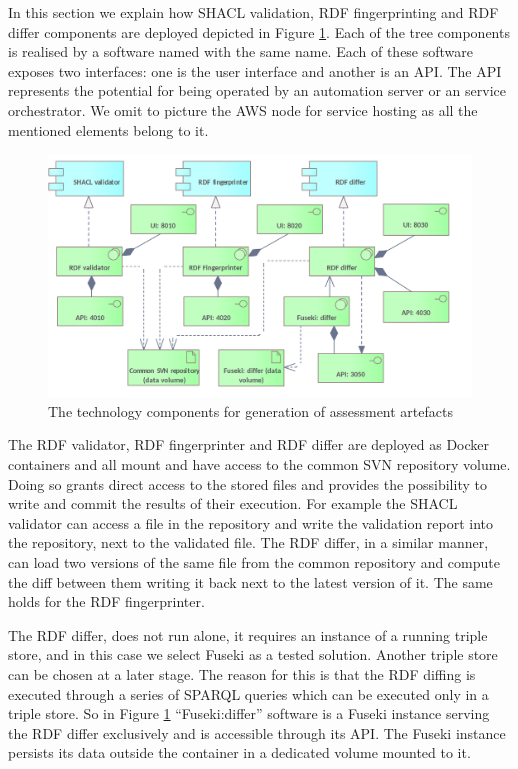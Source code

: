 	In this section we explain how SHACL validation, RDF fingerprinting and RDF differ components are deployed depicted in Figure \ref{fig:technology-view-validation}. Each of the tree components is realised by a software named with the same name. Each of these software exposes two interfaces: one is the user interface and another is an API. The API represents the potential for being operated by an automation server or an service orchestrator. We omit to picture the AWS node for service hosting as all the mentioned elements belong to it.
	
	\begin{figure}[!h]
		\centering
		\includegraphics[width=\textwidth]{images/infra-setup/validation v2.png}
		\caption{The technology components for generation of assessment artefacts}
		\label{fig:technology-view-validation}
	\end{figure}

	The RDF validator, RDF fingerprinter and RDF differ are deployed as Docker containers and all mount and have access to the common SVN repository volume. Doing so grants direct access to the stored files and provides the possibility to write and commit the results of their execution. For example the SHACL validator can access a file in the repository and write the validation report into the repository, next to the validated file. The RDF differ, in a similar manner, can load two versions of the same file from the common repository and compute the diff between them writing it back next to the latest version of it. The same holds for the RDF fingerprinter. 
	
	The RDF differ, does not run alone, it requires an instance of a running triple store, and in this case we select Fuseki as a tested solution. Another triple store can be chosen at a later stage. The reason for this is that the RDF diffing is executed through a series of SPARQL queries which can be executed only in a triple store. So in Figure \ref{fig:technology-view-validation} ``Fuseki:differ'' software is a Fuseki instance serving the RDF differ exclusively and is accessible through its API. The Fuseki instance persists its data outside the container in a dedicated volume mounted to it. 
	
